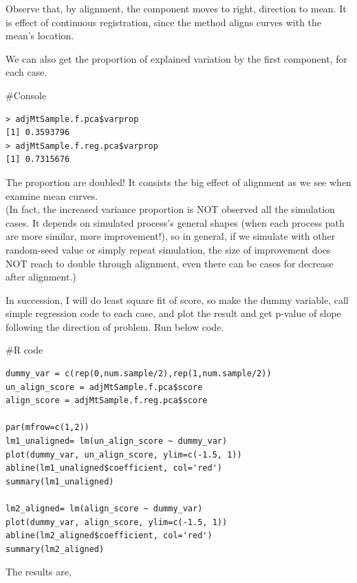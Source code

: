 \documentclass{article}
\newenvironment{Rcode}%
{%
    \begin{mdframed}
    \#R code
    \begin{small}
}
{%
    \end{small}
    \end{mdframed}
}
\newenvironment{console}%
{%
    \begin{mdframed}
    \#Console
    \begin{small}
}
{%
    \end{small}
    \end{mdframed}
}
\begin{document}
Observe that, by alignment, the component moves to right, direction to mean. It is effect of continuous registration,
since the method aligns curves with the mean's location.

We can also get the proportion of explained variation by the first component, for each case.
\begin{console}
    \begin{verbatim}
> adjMtSample.f.pca$varprop
[1] 0.3593796
> adjMtSample.f.reg.pca$varprop
[1] 0.7315676
    \end{verbatim}
\end{console}
The proportion are doubled! It consists the big effect of alignment as we see when examine mean curves. \\
(In fact, the increased variance proportion is NOT observed all the simulation cases. It depends on simulated
process's general shapes (when each process path are more similar, more improvement!), 
so in general, if we simulate with other random-seed value or simply repeat simulation, the size of improvement does NOT reach
to double through alignment, even there can be cases for decrease after alignment.)

In succession, I will do least square fit of score, 
so make the dummy variable, call simple regression code to each case,
and plot the result and get p-value of slope following the direction of problem.
Run below code.
\begin{Rcode}
    \begin{verbatim}
dummy_var = c(rep(0,num.sample/2),rep(1,num.sample/2))
un_align_score = adjMtSample.f.pca$score
align_score = adjMtSample.f.reg.pca$score

par(mfrow=c(1,2))
lm1_unaligned= lm(un_align_score ~ dummy_var)
plot(dummy_var, un_align_score, ylim=c(-1.5, 1))
abline(lm1_unaligned$coefficient, col='red')
summary(lm1_unaligned)

lm2_aligned= lm(align_score ~ dummy_var)
plot(dummy_var, align_score, ylim=c(-1.5, 1))
abline(lm2_aligned$coefficient, col='red')
summary(lm2_aligned)        
    \end{verbatim}
\end{Rcode}

The results are,
\end{document}
